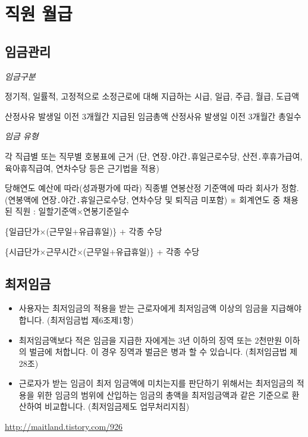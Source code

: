 ﻿\section{직원 월급}
\subsection{임금관리}
\emph{임금구분}
\begin{description}\tightlist
\item[통상임금] 정기적, 일률적, 고정적으로 소정근로에 대해 지급하는 
   시급, 일급, 주급, 월급, 도급액
\item[평균임금] 산정사유 발생일 이전 3개월간 지급된 임금총액
     산정사유 발생일 이전 3개월간 총일수
\end{description}
\emph{임금 유형}
\begin{description}\tightlist
\item[호봉제] 각 직급별 또는 직무별 호봉표에 근거
   (단, 연장․야간․휴일근로수당, 산전․후휴가급여, 육아휴직급여,
    연차수당 등은 근기법을 적용)  

\item[연봉제] 당해연도 예산에 따라(성과평가에 따라) 직종별 연봉산정 기준액에 따라
   회사가 정함.
   (연봉액에 연장․야간․휴일근로수당, 연차수당 및 퇴직금 미포함)
   ※ 회계연도 중 채용된 직원 : 일할기준액×연봉기준일수

\item[일급제] \{일급단가×(근무일+유급휴일)\} + 각종 수당
\item[시급제] \{시급단가×근무시간×(근무일+유급휴일)\} + 각종 수당
\end{description}

\subsection{최저임금}
\par
\begin{itemize}\tightlist
\item 사용자는 최저임금의 적용을 받는 근로자에게 최저임금액 이상의 임금을 지급해야 합니다. (최저임금법 제6조제1항)
\item 최저임금액보다 적은 임금을 지급한 자에게는 3년 이하의 징역 또는 2천만원 이하의 벌금에 처합니다. 이 경우 징역과 벌금은 병과 할 수 있습니다. (최저임금법 제28조)
\item 근로자가 받는 임금이 최저 임금액에 미치는지를 판단하기 위해서는 최저임금의 적용을 위한 임금의 범위에 산입하는 임금의 총액을 최저임금액과 같은 기준으로 환산하여 비교합니다. (최저임금제도 업무처리지침)
\end{itemize}
\url{http://maitland.tistory.com/926}
\par
\medskip

